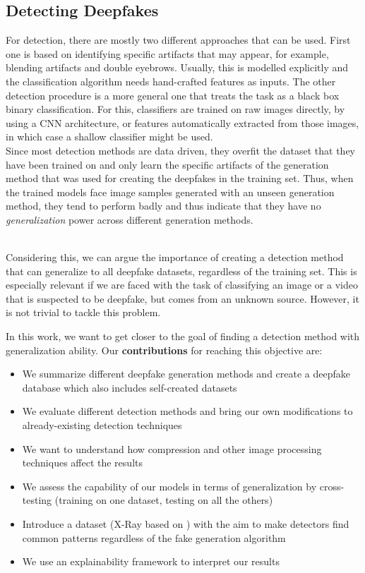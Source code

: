 \documentclass[11pt]{article}
\begin{document}
\subsection*{Detecting Deepfakes}
For detection, there are mostly two different approaches that can be used. First one is based on identifying specific artifacts that may appear, for example, blending artifacts and double eyebrows. Usually, this is modelled explicitly and the classification algorithm needs hand-crafted features as inputs. The other detection procedure is a more general one that treats the task as a black box binary classification. For this, classifiers are trained on raw images directly, by using a CNN architecture, or features automatically extracted from those images, in which case a shallow classifier might be used. \\
Since most detection methods are data driven, they overfit the dataset that they have been trained on and only learn the specific artifacts of the generation method that was used for creating the deepfakes in the training set. Thus, when the trained models face image samples generated with an unseen generation method, they tend to perform badly and thus indicate that they have no \emph{generalization} power across different generation methods.

\\
Considering this, we can argue the importance of creating a detection method that can generalize to all deepfake datasets, regardless of the training set. This is especially relevant if we are faced with the task of classifying an image or a video that is suspected to be deepfake, but comes from an unknown source. However, it is not trivial to tackle this problem.

In this work, we want to get closer to the goal of finding a detection method with generalization ability. Our \textbf{contributions} for reaching this objective are:
\begin{itemize}
    \item We summarize different deepfake generation methods and create a deepfake database which also includes self-created datasets
    \item We evaluate different detection methods and bring our own modifications to already-existing detection techniques
    \item We want to understand how compression and other image processing techniques affect the results
    \item We assess the capability of our models in terms of generalization by cross-testing (training on one dataset, testing on all the others)
    \item Introduce a dataset (X-Ray based on \cite{li2020face}) with the aim to make detectors find common patterns regardless of the fake generation algorithm
    \item We use an explainability framework to interpret our results
\end{itemize}
\end{document}
